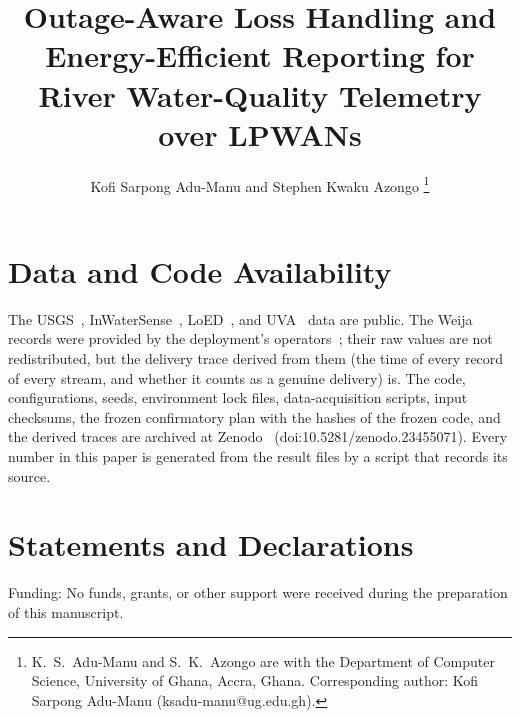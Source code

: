 \documentclass[journal,10pt,onecolumn,draftclsnofoot]{IEEEtran}
\begin{document}
\doublespacing

\title{Outage-Aware Loss Handling and Energy-Efficient Reporting for River Water-Quality Telemetry over LPWANs}

\author{Kofi Sarpong Adu-Manu and Stephen Kwaku Azongo
\thanks{K.~S.~Adu-Manu and S.~K.~Azongo are with the Department of Computer Science, University of Ghana, Accra, Ghana. Corresponding author: Kofi Sarpong Adu-Manu (ksadu-manu@ug.edu.gh).}}

\maketitle











\section*{Data and Code Availability}
The USGS~\cite{usgs2023nwis}, InWaterSense~\cite{ahmedi2021inwatersense}, LoED~\cite{bhatia2020loeddata}, and UVA~\cite{nikseresht2025uvadata} data are public. The Weija records were provided by the deployment's operators~\cite{adumanu2020smart}; their raw values are not redistributed, but the delivery trace derived from them (the time of every record of every stream, and whether it counts as a genuine delivery) is. The code, configurations, seeds, environment lock files, data-acquisition scripts, input checksums, the frozen confirmatory plan with the hashes of the frozen code, and the derived traces are archived at Zenodo~\cite{azongo2026code} (doi:10.5281/zenodo.23455071). Every number in this paper is generated from the result files by a script that records its source.

\section*{Statements and Declarations}
Funding: No funds, grants, or other support were received during the preparation of this manuscript.



\end{document}
